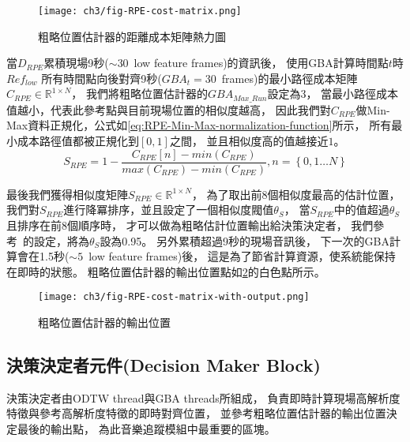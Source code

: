 \documentclass[class=NCU_thesis, crop=false]{standalone}
\begin{document}
\begin{figure}[H]
    \centering
    \texttt{[image: ch3/fig-RPE-cost-matrix.png]}
    \caption{粗略位置估計器的距離成本矩陣熱力圖}
    \label{fig:fig-ch3-RPE-cost-matrix}
\end{figure}

當$D_{RPE}$累積現場9秒($\sim 30$\ low feature frames)的資訊後，
使用GBA計算時間點$t$時$Ref_{low}$
所有時間點向後對齊9秒($GBA_t = 30$\ frames)的最小路徑成本矩陣$C_{RPE} \in \mathbb{R}^{1 \times N}$，
我們將粗略位置估計器的$GBA_{Max\_Run}$設定為3，
當最小路徑成本值越小，代表此參考點與目前現場位置的相似度越高，
因此我們對$C_{RPE}$做Min-Max資料正規化，公式如\cref{eq:RPE-Min-Max-normalization-function}所示，
所有最小成本路徑值都被正規化到$[0,1]$之間，
並且相似度高的值越接近$1$。
\begin{equation}
    \label{eq:RPE-Min-Max-normalization-function}
    S_{RPE} = 1-\frac{C_{RPE}[n]-min(C_{RPE})}{max(C_{RPE})-min(C_{RPE})},
    n = \left\{0, 1 \ldots N\right\} 
\end{equation}

最後我們獲得相似度矩陣$S_{RPE} \in \mathbb{R}^{1 \times N}$，
為了取出前8個相似度最高的估計位置，
我們對$S_{RPE}$進行降冪排序，並且設定了一個相似度閥值$\theta _{S}$，
當$S_{RPE}$中的值超過$\theta _{S}$且排序在前8個順序時，
才可以做為粗略估計位置輸出給決策決定者，
我們參考~\cite{Arzt2010Towards}的設定，將為$\theta _{S}$設為0.95。
另外累積超過9秒的現場音訊後，
下一次的GBA計算會在1.5秒($\sim 5$\ low feature frames)後，
這是為了節省計算資源，使系統能保持在即時的狀態。
粗略位置估計器的輸出位置點如\cref{fig:fig-ch3-RPE-cost-matrix-with-output}的白色點所示。
\begin{figure}[H]
    \centering
    \texttt{[image: ch3/fig-RPE-cost-matrix-with-output.png]}
    \caption{粗略位置估計器的輸出位置}
    \label{fig:fig-ch3-RPE-cost-matrix-with-output}
\end{figure}


\subsection{決策決定者元件(Decision Maker Block)} \label{ch3-subst-decision-maker}
決策決定者由ODTW thread與GBA threads所組成，
負責即時計算現場高解析度特徵與參考高解析度特徵的即時對齊位置，
並參考粗略位置估計器的輸出位置決定最後的輸出點，
為此音樂追蹤模組中最重要的區塊。
\end{document}
